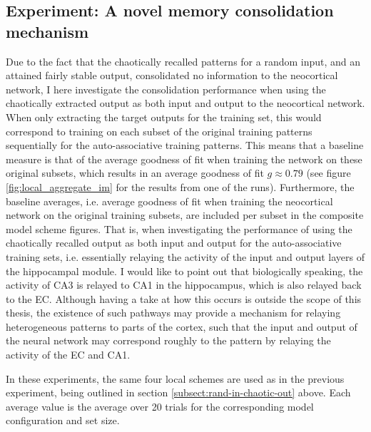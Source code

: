 \subsection{Experiment: A novel memory consolidation mechanism} %

Due to the fact that the chaotically recalled patterns for a random input, and an attained fairly stable output, consolidated no information to the neocortical network, I here investigate the consolidation performance when using the chaotically extracted output as both input and output to the neocortical network. When only extracting the target outputs for the training set, this would correspond to training on each subset of the original training patterns sequentially for the auto-associative training patterns. This means that a baseline measure is that of the average goodness of fit when training the network on these original subsets, which results in an average goodness of fit $g \approx 0.79$ (see figure \ref{fig:local_aggregate_im} for the results from one of the runs). Furthermore, the baseline averages, i.e. average goodness of fit when training the neocortical network on the original training subsets, are included per subset in the composite model scheme figures. That is, when investigating the performance of using the chaotically recalled output as both input and output for the auto-associative training sets, i.e. essentially relaying the activity of the input and output layers of the hippocampal module.
I would like to point out that biologically speaking, the activity of CA3 is relayed to CA1 in the hippocampus, which is also relayed back to the EC. Although having a take at how this occurs is outside the scope of this thesis, the existence of such pathways may provide a mechanism for relaying heterogeneous patterns to parts of the cortex, such that the input and output of the neural network may correspond roughly to the pattern by relaying the activity of the EC and CA1.

In these experiments, the same four local schemes are used as in the previous experiment, being outlined in section \ref{subsect:rand-in-chaotic-out} above. Each average value is the average over 20 trials for the corresponding model configuration and set size.


